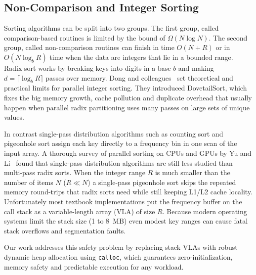 \documentclass[conference]{IEEEtran}
\begin{document}
\subsection{Non-Comparison and Integer Sorting}
Sorting algorithms can be split into two groups. The first group, called comparison-based routines is limited by the bound of $\Omega(N \log N)$. The second group, called non-comparison routines can finish in time $O(N + R)$ or in $O(N \log_b R)$ time when the data are integers that lie in a bounded range. Radix sort works by breaking keys into digits in a base $b$ and making $d = \lceil\log_b R\rceil$ passes over memory. Dong and colleagues~\cite{dong2024} set theoretical and practical limits for parallel integer sorting. They introduced DovetailSort, which fixes the big memory growth, cache pollution and duplicate overhead that usually happen when parallel radix partitioning uses many passes on large sets of unique values.

In contrast single-pass distribution algorithms such as counting sort and pigeonhole sort assign each key directly to a frequency bin in one scan of the input array. A thorough survey of parallel sorting on CPUs and GPUs by Yu and Li~\cite{yu2022} found that single-pass distribution algorithms are still less studied than multi-pass radix sorts. When the integer range $R$ is much smaller than the number of items $N$ ($R \ll N$) a single-pass pigeonhole sort skips the repeated memory round-trips that radix sorts need while still keeping L1/L2 cache locality. Unfortunately most textbook implementations put the frequency buffer on the call stack as a variable-length array (VLA) of size $R$. Because modern operating systems limit the stack size (1 to 8~MB) even modest key ranges can cause fatal stack overflows and segmentation faults.

Our work addresses this safety problem by replacing stack VLAs with robust dynamic heap allocation using \texttt{calloc}, which guarantees zero-initialization, memory safety and predictable execution for any workload.
\end{document}
